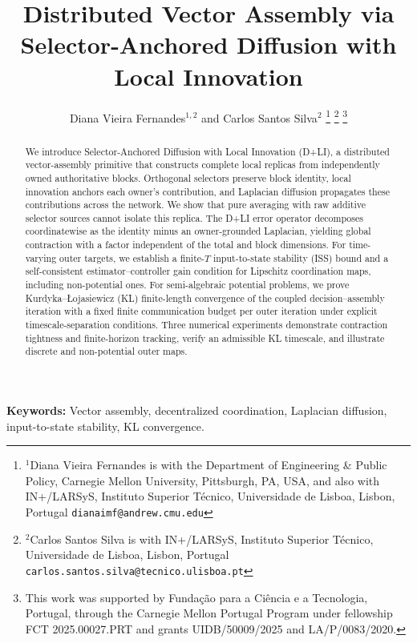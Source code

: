 \documentclass[letterpaper, 10 pt, conference]{ieeeconf} %
\title{\LARGE \bf
Distributed Vector Assembly via Selector-Anchored Diffusion with Local Innovation}
\author{%
Diana Vieira Fernandes$^{1,2}$ and Carlos Santos Silva$^{2}$
%
\thanks{$^{1}$Diana Vieira Fernandes is with the Department of Engineering \& Public Policy, Carnegie Mellon University, Pittsburgh, PA, USA, and also with IN+/LARSyS, Instituto Superior T\'ecnico, Universidade de Lisboa, Lisbon, Portugal {\tt\small dianaimf@andrew.cmu.edu}}%
\thanks{$^{2}$Carlos Santos Silva is with IN+/LARSyS, Instituto Superior T\'ecnico, Universidade de Lisboa, Lisbon, Portugal {\tt\small carlos.santos.silva@tecnico.ulisboa.pt}}%
\thanks{This work was supported by Funda\c{c}\~ao para a Ci\^encia e a Tecnologia, Portugal, through the Carnegie Mellon Portugal Program under fellowship FCT 2025.00027.PRT and grants UIDB/50009/2025 and LA/P/0083/2020.}
}
\newenvironment{IEEEkeywords}
{\par\noindent\textbf{Keywords: }\ignorespaces}
{\par}
\begin{document}
\maketitle
\thispagestyle{empty}
\pagestyle{empty}

\begin{abstract}
We introduce Selector-Anchored Diffusion with Local Innovation (D+LI), a distributed vector-assembly primitive that constructs complete local replicas from independently owned authoritative blocks. Orthogonal selectors preserve block identity, local innovation anchors each owner's contribution, and Laplacian diffusion propagates these contributions across the network. We show that pure averaging with raw additive selector sources cannot isolate this replica. The D+LI error operator decomposes coordinatewise as the identity minus an owner-grounded Laplacian, yielding global contraction with a factor independent of the total and block dimensions. For time-varying outer targets, we establish a finite-$T$ input-to-state stability (ISS) bound and a self-consistent estimator–controller gain condition for Lipschitz coordination maps, including non-potential ones. For semi-algebraic potential problems, we prove Kurdyka--\L{}ojasiewicz (KL) finite-length convergence of the coupled decision--assembly iteration with a fixed finite communication budget per outer iteration under explicit timescale-separation conditions. Three numerical experiments demonstrate contraction tightness and finite-horizon tracking, verify an admissible KL timescale, and illustrate discrete and non-potential outer maps.
\end{abstract}

\begin{IEEEkeywords}
Vector assembly, decentralized coordination, Laplacian diffusion, input-to-state stability, KL convergence.
\end{IEEEkeywords}
\end{document}
